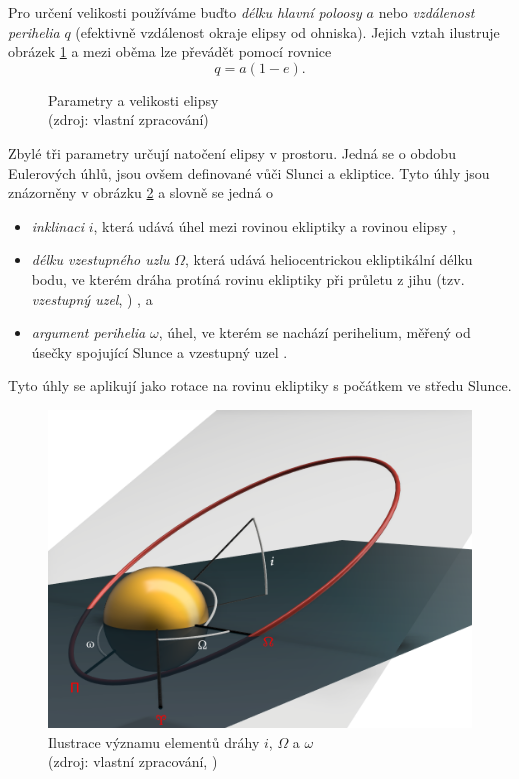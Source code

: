 Pro určení velikosti používáme buďto \textit{délku hlavní poloosy} $a$ nebo \textit{vzdálenost perihelia} $q$ (efektivně vzdálenost okraje elipsy od ohniska). Jejich vztah ilustruje obrázek \ref{img:orbit:ellipse} a mezi oběma lze převádět pomocí rovnice \cite{ceplecha}
$$
    q=a(1-e)\text{.}
$$

\begin{figure}[ht]
    \centering
    \caption[Parametry a velikosti elipsy]{Parametry a velikosti elipsy\\{\small (zdroj: vlastní zpracování)}}
    \label{img:orbit:ellipse}
\end{figure}

\smallskip

Zbylé tři parametry určují natočení elipsy v prostoru. Jedná se o obdobu Eulerových úhlů, jsou ovšem definované vůči Slunci a ekliptice. Tyto úhly jsou znázorněny v obrázku \ref{img:orbit:elements} a slovně se jedná o
\begin{itemize}
    \item \textit{inklinaci} $i$, která udává úhel mezi rovinou ekliptiky a rovinou elipsy \cite{astro},
    \item \textit{délku vzestupného uzlu} $\Omega$, která udává heliocentrickou ekliptikální délku bodu, ve kterém dráha protíná rovinu ekliptiky při průletu z jihu (tzv. \textit{vzestupný uzel}, \NorthNode) \cite{astro}, a
    \item \textit{argument perihelia} $\omega$, úhel, ve kterém se nachází perihelium, měřený od úsečky spojující Slunce a vzestupný uzel \cite{astro}.
\end{itemize}
Tyto úhly se aplikují jako rotace na rovinu ekliptiky s počátkem ve středu Slunce.

\begin{figure}[ht]
    \centering
    \includegraphics[width=0.8\linewidth]{img/orbit-elements-marked.png}
    \caption[Ilustrace významu elementů dráhy $i$, $\Omega$ a $\omega$]{
    Ilustrace významu elementů dráhy $i$, $\Omega$ a $\omega$\\
    {\small (zdroj: vlastní zpracování, \cite{astro})}
    }
    \label{img:orbit:elements}
\end{figure}

